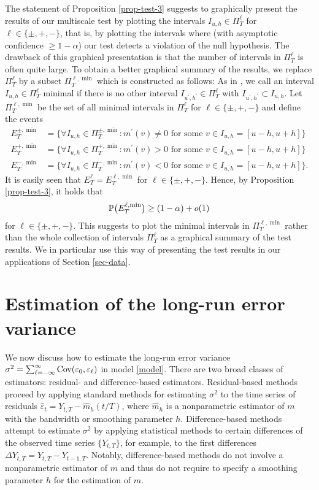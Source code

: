 The statement of Proposition \ref{prop-test-3} suggests to graphically present the results of our multiscale test by plotting the intervals $I_{u,h} \in \Pi_T^\ell$ for $\ell \in \{\pm, +,-\}$, that is, by plotting the intervals where (with asymptotic confidence $\ge 1-\alpha$) our test detects a violation of the null hypothesis. The drawback of this graphical presentation is that the number of intervals in $\Pi_T^\ell$ is often quite large. To obtain a better graphical summary of the results, we replace $\Pi_T^\ell$ by a subset $\Pi_T^{\ell,\min}$ which is constructed as follows: As in \cite{Duembgen2002}, we call an interval $I_{u,h} \in \Pi_T^\ell$ minimal if there is no other interval $I_{u^\prime,h^\prime} \in \Pi_T^\ell$ with $I_{u^\prime,h^\prime} \subset I_{u,h}$. Let $\Pi_T^{\ell,\min}$ be the set of all minimal intervals in $\Pi_T^\ell$ for $\ell \in \{\pm, +,-\}$ and define the events
\begin{align*}
E_T^{\pm,\min} & = \Big\{ \forall I_{u,h} \in \Pi_T^{\pm,\min}: m^\prime(v) \ne 0 \text{ for some } v \in I_{u,h} = [u-h,u+h] \Big\} \\
E_T^{+,\min} & = \Big\{ \forall I_{u,h} \in \Pi_T^{+,\min}: m^\prime(v) > 0 \text{ for some } v \in I_{u,h} = [u-h,u+h] \Big\} \\ 
E_T^{-,\min} & = \Big\{ \forall I_{u,h} \in \Pi_T^{-,\min}: m^\prime(v) < 0 \text{ for some } v \in I_{u,h} = [u-h,u+h] \Big\}.  
\end{align*}
It is easily seen that $E_T^\ell = E_T^{\ell,\min}$ for $\ell \in \{\pm, +,-\}$. Hence, by Proposition \ref{prop-test-3}, it holds that 
\[ \mathbb{P} \big(E_T^{\ell,\min}\big) \ge (1-\alpha) + o(1) \] 
for $\ell \in \{\pm, +,-\}$. This suggests to plot the minimal intervals in $\Pi_T^{\ell,\min}$ rather than the whole collection of intervals $\Pi_T^\ell$ as a graphical summary of the test results. We in particular use this way of presenting the test results in our applications of Section \ref{sec-data}. 



\section{Estimation of the long-run error variance}\label{sec-error-var}


We now discuss how to estimate the long-run error variance $\sigma^2 = \sum\nolimits_{\ell=-\infty}^{\infty} \textnormal{Cov}(\varepsilon_0,\varepsilon_{\ell})$ in model \eqref{model}. There are two broad classes of estimators: residual- and difference-based estimators. Residual-based methods proceed by applying standard methods for estimating $\sigma^2$ to the time series of residuals $\widehat{\varepsilon}_t = Y_{t,T} - \widehat{m}_h(t/T)$, where $\widehat{m}_h$ is a nonparametric estimator of $m$ with the bandwidth or smoothing parameter $h$. Difference-based methods attempt to estimate $\sigma^2$ by applying statistical methods to certain differences of the observed time series $\{Y_{t,T}\}$, for example, to the first differences $\Delta Y_{t,T} = Y_{t,T} - Y_{t-1,T}$. Notably, difference-based methods do not involve a nonparametric estimator of $m$ and thus do not require to specify a smoothing parameter $h$ for the estimation of $m$. 


